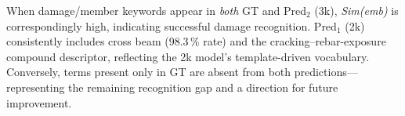 ﻿\documentclass[onecolumn]{article}
\begin{document}
\noindent When damage/member keywords appear in \emph{both} GT and Pred$_2$ (3k), \textit{Sim(emb)} is correspondingly high, indicating successful damage recognition. Pred$_1$ (2k) consistently includes cross beam (98.3\,\% rate) and the cracking--rebar-exposure compound descriptor, reflecting the 2k model's template-driven vocabulary. Conversely, terms present only in GT are absent from both predictions---representing the remaining recognition gap and a direction for future improvement.
\end{document}
